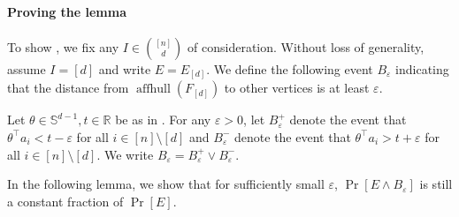 \documentclass{article}\usepackage[a4paper,margin=20mm]{geometry}
\newcommand{\R}{\mathbb R}
\newcommand{\T}{\top}
\newcommand{\aff}{\operatorname{affhull}}
\newcommand{\eps}{\varepsilon} %
\renewcommand{\epsilon}{\varepsilon} %
\begin{document}
\paragraph{Proving the lemma}
To show , we fix any $I \in \binom{[n]}{d}$ of consideration.
Without loss of generality, assume $I = [d]$ and write $E = E_{[d]}$.
We define the following event $B_{\epsilon}$ indicating that the distance from
$\aff(F_{[d]})$ to other vertices is at least $\epsilon$.

\begin{definition}\label{def:Beps}
    Let $\theta \in \mathbb S^{d-1}, t \in \R$ be as in .
For any $\eps > 0$, let $B_\eps^+$ denote the event that
$\theta^\T a_i < t - \eps$ for all $i \in [n]\setminus[d]$
and $B_\eps^-$ denote the event that
$\theta^\T a_i > t + \eps$ for all $i \in [n]\setminus[d]$.
We write $B_\eps = B_\eps^+ \vee B_\eps^-$.
\end{definition}

In the following lemma, we show that for sufficiently small $\epsilon$, $\Pr[E \wedge B_{\epsilon}]$ is still a constant fraction of $\Pr[E]$.
\end{document}

